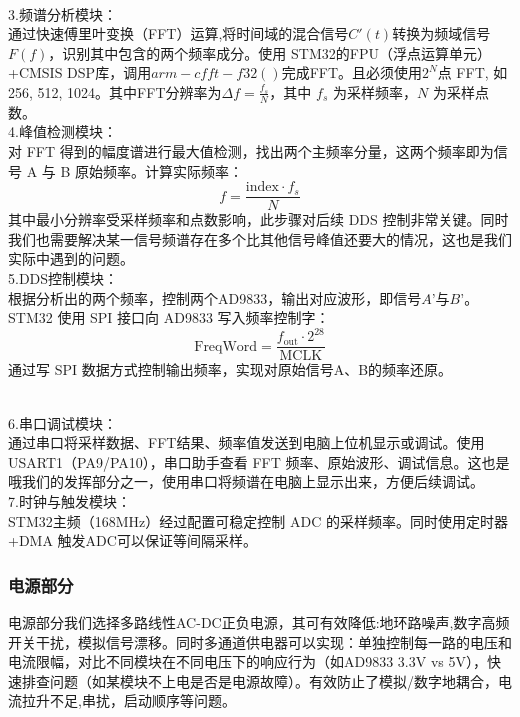 \documentclass{article}
\begin{document}
\begin{enumerate}
\begin{enumerate}
\\3.频谱分析模块：
\\通过快速傅里叶变换（FFT）运算,将时间域的混合信号$C'(t)$转换为频域信号$F(f)$，识别其中包含的两个频率成分。使用 STM32的FPU（浮点运算单元）+CMSIS DSP库，调用$arm-cfft-f32()$完成FFT。且必须使用\( 2^N \)点 FFT, 如 256, 512, 1024。其中FFT分辨率为\(\Delta f = \frac{f_s}{N}\)，其中 \( f_s \) 为采样频率，\( N \) 为采样点数。
\\4.峰值检测模块：
\\对 FFT 得到的幅度谱进行最大值检测，找出两个主频率分量，这两个频率即为信号 A 与 B 原始频率。计算实际频率：\begin{equation}
f = \frac{\text{index} \cdot f_s}{N}
\end{equation}其中最小分辨率受采样频率和点数影响，此步骤对后续 DDS 控制非常关键。同时我们也需要解决某一信号频谱存在多个比其他信号峰值还要大的情况，这也是我们实际中遇到的问题。
\\5.DDS控制模块：
\\根据分析出的两个频率，控制两个AD9833，输出对应波形，即信号$A’$与$B’$。STM32 使用 SPI 接口向 AD9833 写入频率控制字：\begin{equation}
\text{FreqWord} = \frac{f_{\text{out}} \cdot 2^{28}}{\text{MCLK}}
\end{equation}通过写 SPI 数据方式控制输出频率，实现对原始信号A、B的频率还原。

\\6.串口调试模块：
\\通过串口将采样数据、FFT结果、频率值发送到电脑上位机显示或调试。使用 USART1（PA9/PA10），串口助手查看 FFT 频率、原始波形、调试信息。这也是哦我们的发挥部分之一，使用串口将频谱在电脑上显示出来，方便后续调试。
\\7.时钟与触发模块：
\\STM32主频（168MHz）经过配置可稳定控制 ADC 的采样频率。同时使用定时器+DMA 触发ADC可以保证等间隔采样。
\end{enumerate} 



\subsubsection{电源部分}
\begin{enumerate}
电源部分我们选择多路线性AC-DC正负电源，其可有效降低:地环路噪声,数字高频开关干扰，模拟信号漂移。同时多通道供电器可以实现：单独控制每一路的电压和电流限幅，对比不同模块在不同电压下的响应行为（如AD9833 3.3V vs 5V），快速排查问题（如某模块不上电是否是电源故障）。有效防止了模拟/数字地耦合，电流拉升不足,串扰，启动顺序等问题。
\end{enumerate}    


\end{enumerate}
\end{document}
